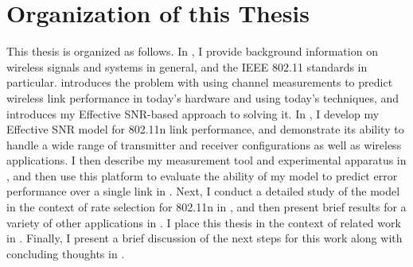 \section{Organization of this Thesis}
\label{sec:intro_organization}
This thesis is organized as follows. In , I provide background information on wireless signals and systems in general, and the IEEE 802.11 standards in particular.  introduces the problem with using channel measurements to predict wireless link performance in today's hardware and using today's techniques, and introduces my Effective SNR-based approach to solving it. In , I develop my Effective SNR model for 802.11n link performance, and demonstrate its ability to handle a wide range of transmitter and receiver configurations as well as wireless applications. I then describe my measurement tool and experimental apparatus in , and then use this platform to evaluate the ability of my model to predict error performance over a single link in . Next, I conduct a detailed study of the model in the context of rate selection for 802.11n in , and then present brief results for a variety of other applications in . I place this thesis in the context of related work in . Finally, I present a brief discussion of the next steps for this work along with concluding thoughts in .

\ifx\mainfile\undefined

\fi
